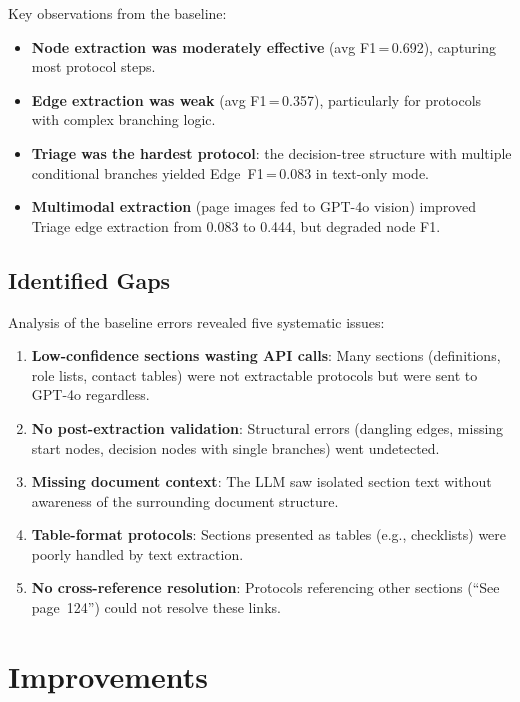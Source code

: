 \documentclass[12pt,a4paper]{article}
\begin{document}
Key observations from the baseline:
\begin{itemize}[leftmargin=2em]
    \item \textbf{Node extraction was moderately effective} (avg F1\,=\,0.692), capturing most protocol steps.
    \item \textbf{Edge extraction was weak} (avg F1\,=\,0.357), particularly for protocols with complex branching logic.
    \item \textbf{Triage was the hardest protocol}: the decision-tree structure with multiple conditional branches yielded Edge~F1\,=\,0.083 in text-only mode.
    \item \textbf{Multimodal extraction} (page images fed to GPT-4o vision) improved Triage edge extraction from 0.083 to 0.444, but degraded node F1.
\end{itemize}

\subsection{Identified Gaps}

Analysis of the baseline errors revealed five systematic issues:
\begin{enumerate}[leftmargin=2em]
    \item \textbf{Low-confidence sections wasting API calls}: Many sections (definitions, role lists, contact tables) were not extractable protocols but were sent to GPT-4o regardless.
    \item \textbf{No post-extraction validation}: Structural errors (dangling edges, missing start nodes, decision nodes with single branches) went undetected.
    \item \textbf{Missing document context}: The LLM saw isolated section text without awareness of the surrounding document structure.
    \item \textbf{Table-format protocols}: Sections presented as tables (e.g., checklists) were poorly handled by text extraction.
    \item \textbf{No cross-reference resolution}: Protocols referencing other sections (``See page~124'') could not resolve these links.
\end{enumerate}

\section{Improvements}
\label{sec:improvements}
\end{document}
